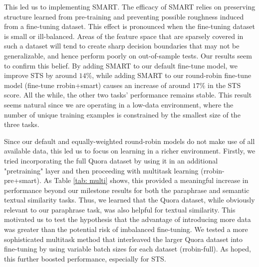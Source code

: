 \documentclass{article}
\begin{document}
This led us to implementing SMART. The efficacy of SMART relies on preserving structure learned from pre-training and preventing possible roughness induced from a fine-tuning dataset. This effect is pronounced when the fine-tuning dataset is small or ill-balanced. Areas of the feature space that are sparsely covered in such a dataset will tend to create sharp decision boundaries that may not be generalizable, and hence perform poorly on out-of-sample tests. Our results seem to confirm this belief. By adding SMART to our default fine-tune model, we improve STS by around $14\%$, while adding SMART to our round-robin fine-tune model (fine-tune rrobin+smart) causes an increase of around $17\%$ in the STS score. All the while, the other two tasks' performance remains stable. This result seems natural since we are operating in a low-data environment, where the number of unique training examples is constrained by the smallest size of the three tasks. 

Since our default and equally-weighted round-robin models do not make use of all available data, this led us to focus on learning in a richer environment. Firstly, we tried incorporating the full Quora dataset by using it in an additional "pretraining" layer and then proceeding with multitask learning (rrobin-pre+smart). As Table \ref{tab: multi} shows, this provided a meaningful increase in performance beyond our milestone results for both the paraphrase and semantic textual similarity tasks. Thus, we learned that the Quora dataset, while obviously relevant to our paraphrase task, was also helpful for textual similarity. This motivated us to test the hypothesis that the advantage of introducing more data was greater than the potential risk of imbalanced fine-tuning. We tested a more sophisticated multitask method that interleaved the larger Quora dataset into fine-tuning by using variable batch sizes for each dataset (rrobin-full). As hoped, this further boosted performance, especially for STS.
\end{document}
